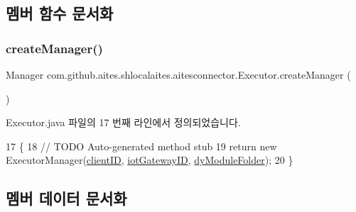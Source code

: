 \subsection{멤버 함수 문서화}
\mbox{\label{classcom_1_1github_1_1aites_1_1shlocalaites_1_1aitesconnector_1_1_executor_a22f395c905fdb7efe7722646b8dc5f81}} 
\subsubsection{\texorpdfstring{create\+Manager()}{createManager()}}
{\footnotesize\ttfamily Manager com.\+github.\+aites.\+shlocalaites.\+aitesconnector.\+Executor.\+create\+Manager (\begin{DoxyParamCaption}{ }\end{DoxyParamCaption})}



Executor.\+java 파일의 17 번째 라인에서 정의되었습니다.


\begin{DoxyCode}
17                                    \{
18         \textcolor{comment}{// TODO Auto-generated method stub}
19         \textcolor{keywordflow}{return} \textcolor{keyword}{new} ExecutorManager(\mbox{\hyperlink{classcom_1_1github_1_1aites_1_1shlocalaites_1_1aitesconnector_1_1_executor_a1f8892f17413f1001a35650585deb2c6}{clientID}}, \mbox{\hyperlink{classcom_1_1github_1_1aites_1_1shlocalaites_1_1aitesconnector_1_1_executor_ac83ca28f1a24d45b2e4f1890fc9f8491}{iotGatewayID}}, 
      \mbox{\hyperlink{classcom_1_1github_1_1aites_1_1shlocalaites_1_1aitesconnector_1_1_executor_a071d3608be94d2e9f089119d191a3aa1}{dyModuleFolder}});
20     \}
\end{DoxyCode}


\subsection{멤버 데이터 문서화}
\mbox{\label{classcom_1_1github_1_1aites_1_1shlocalaites_1_1aitesconnector_1_1_executor_a1f8892f17413f1001a35650585deb2c6}} 
